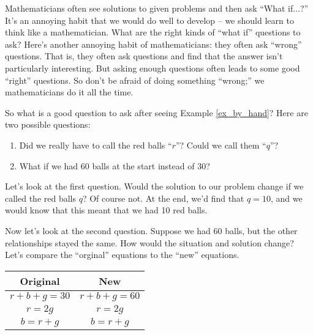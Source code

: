 Mathematicians often see solutions to given problems and then ask ``What if$\ldots$?'' It's an annoying habit that we would do well to develop -- we should learn to think like a mathematician. What are the right kinds of ``what if'' questions to ask? Here's another annoying habit of mathematicians: they often ask ``wrong'' questions. That is, they often ask questions and find that the answer isn't particularly interesting. But asking enough questions often leads to some good ``right'' questions. So don't be afraid of doing something ``wrong;'' we mathematicians do it all the time.

%

So what is a good question to ask after seeing Example \ref{ex_by_hand}? Here are two possible questions:
		\begin{enumerate}
		\item		Did we really have to call the red balls ``$r$''? Could we call them ``$q$''?
		\item		What if we had 60 balls at the start instead of 30? 
		\end{enumerate}
		
Let's look at the first question. Would the solution to our problem change if we called the red balls $q$? Of course not. At the end, we'd find that $q = 10$, and we would know that this meant that we had 10 red balls. 

Now let's look at the second question. Suppose we had 60 balls, but the other relationships stayed the same. How would the situation and solution change? Let's compare the ``orginal'' equations to the ``new'' equations.
\begin{center}\begin{tabular}{c|c} Original & New \\ \hline $r+b+g=30$ & $r+b+g=60$ \\ $r=2g$ & $r=2g$ \\ $b=r+g$ & $b=r+g$ \\ \end{tabular}\end{center}

